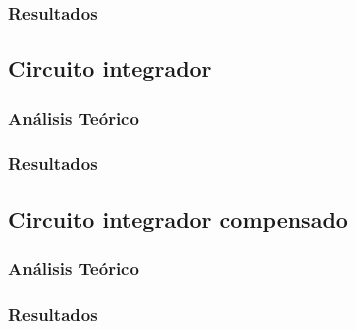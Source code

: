 \subsubsection*{Resultados}


	\subsection*{Circuito integrador}

\subsubsection*{An\'alisis Te\'orico}

\subsubsection*{Resultados}


	\subsection*{Circuito integrador compensado}

\subsubsection*{An\'alisis Te\'orico}

\subsubsection*{Resultados}


